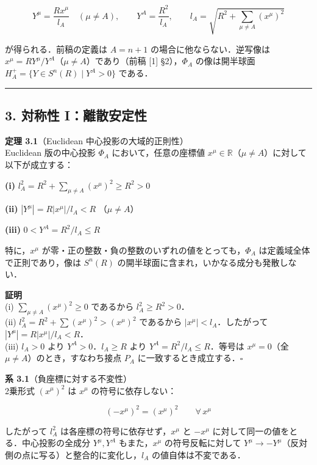 \documentclass[a4paper,11pt]{ltjsarticle}
\theoremstyle{definition}
\begin{document}
\[Y^\mu = \frac{Rx^\mu}{l_A} \quad (\mu \neq A), \qquad Y^A = \frac{R^2}{l_A}, \qquad l_A = \sqrt{R^2 + \sum_{\mu \neq A}(x^\mu)^2} \tag{2.2}\]

が得られる．前稿の定義は \(A = n+1\) の場合に他ならない．逆写像は \(x^\mu = RY^\mu/Y^A\)（\(\mu \neq A\)）であり（前稿 {[}1{]} §2），\(\Phi_A\) の像は開半球面 \(H_A^+ = \{Y \in S^n(R) \mid Y^A > 0\}\) である．

\begin{center}\rule{0.5\linewidth}{0.5pt}\end{center}

\subsection{3. 対称性 I：離散安定性}\label{ux5bfeux79f0ux6027-iux96e2ux6563ux5b89ux5b9aux6027}

\textbf{定理 3.1}（Euclidean 中心投影の大域的正則性）\\
Euclidean 版の中心投影 \(\Phi_A\) において，任意の座標値 \(x^\mu \in \mathbb{R}\)（\(\mu \neq A\)）に対して以下が成立する：

\textbf{(i)} \(l_A^2 = R^2 + \displaystyle\sum_{\mu \neq A}(x^\mu)^2 \geq R^2 > 0\)

\textbf{(ii)} \(|Y^\mu| = R|x^\mu|/l_A < R\) （\(\mu \neq A\)）

\textbf{(iii)} \(0 < Y^A = R^2/l_A \leq R\)

特に，\(x^\mu\) が零・正の整数・負の整数のいずれの値をとっても，\(\Phi_A\) は定義域全体で正則であり，像は \(S^n(R)\) の開半球面に含まれ，いかなる成分も発散しない．

\textbf{証明}\\
(i) \(\sum_{\mu \neq A}(x^\mu)^2 \geq 0\) であるから \(l_A^2 \geq R^2 > 0\)．\\
(ii) \(l_A^2 = R^2 + \sum(x^\mu)^2 > (x^\mu)^2\) であるから \(|x^\mu| < l_A\)．したがって \(|Y^\mu| = R|x^\mu|/l_A < R\)．\\
(iii) \(l_A > 0\) より \(Y^A > 0\)．\(l_A \geq R\) より \(Y^A = R^2/l_A \leq R\)．等号は \(x^\mu = 0\)（全 \(\mu \neq A\)）のとき，すなわち接点 \(P_A\) に一致するとき成立する．\(\square\)

\textbf{系 3.1}（負座標に対する不変性）\\
2乗形式 \((x^\mu)^2\) は \(x^\mu\) の符号に依存しない：

\[(-x^\mu)^2 = (x^\mu)^2 \qquad \forall\, x^\mu \tag{3.1}\]

したがって \(l_A^2\) は各座標の符号に依存せず，\(x^\mu\) と \(-x^\mu\) に対して同一の値をとる．中心投影の全成分 \(Y^\mu, Y^A\) もまた，\(x^\mu\) の符号反転に対して \(Y^\mu \to -Y^\mu\)（反対側の点に写る）と整合的に変化し，\(l_A\) の値自体は不変である．
\end{document}
